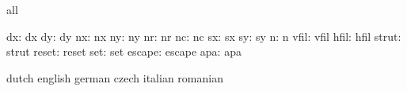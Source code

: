 \stopvariables




\startconstants            all

                       dx: dx
                       dy: dy
                       nx: nx
                       ny: ny
                       nr: nr
                       nc: nc
                       sx: sx
                       sy: sy
                        n: n
                     vfil: vfil
                     hfil: hfil
                    strut: strut
                    reset: reset
                      set: set
                   escape: escape
                      apa: apa

\stopconstants




\startvariables            dutch                     english
                           german                    czech
                           italian                   romanian

